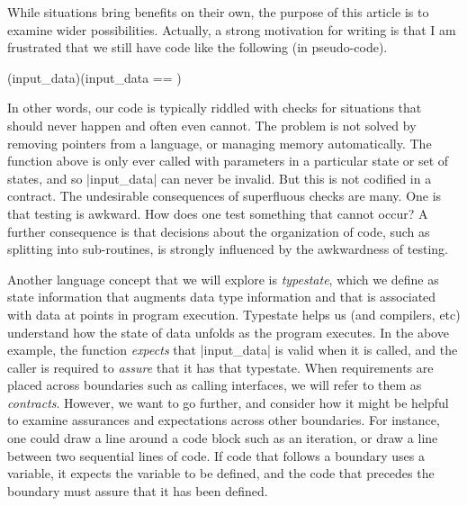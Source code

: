 \documentclass[10pt]{amsart}
\begin{document}
While situations bring benefits on their own, the purpose of this
article is to examine wider possibilities.  Actually, a strong
motivation for writing is that I am frustrated that we still have code
like the following (in pseudo-code).
\begin{offsideBlue}
\begin{PVerbatim}
  \ckw[function](\ctype[*inputStructure] input_data)\cop[:]
     \ckw[if] (input_data == \clab[null])\cop[:]
                
     \cend
  \cend
\end{PVerbatim}
\end{offsideBlue}
In other words, our code is typically riddled with checks for
situations that should never happen and often even cannot.  The
problem is not solved by removing pointers from a language, or
managing memory automatically.  The function above is only ever called
with parameters in a particular state or set of states, and so
|input_data| can never be invalid.  But this is not codified in a
contract.  The undesirable consequences of superfluous checks are
many.  One is that testing is awkward.  How does one test something
that cannot occur?  A further consequence is that decisions about the
organization of code, such as splitting into sub-routines, is strongly
influenced by the awkwardness of testing.

Another language concept that we will explore is \emph{typestate},
which we define as state information that augments data type
information and that is associated with data at points in program
execution.  Typestate helps us (and compilers, etc) understand how the
state of data unfolds as the program executes.  In the above example,
the function \emph{expects} that |input_data| is valid when it is
called, and the caller is required to \emph{assure} that it has that
typestate.  When requirements are placed across boundaries such as
calling interfaces, we will refer to them as \emph{contracts}.
However, we want to go further, and consider how it might be helpful
to examine assurances and expectations across other boundaries.  For
instance, one could draw a line around a code block such as an
iteration, or draw a line between two sequential lines of code.  If
code that follows a boundary uses a variable, it expects the variable
to be defined, and the code that precedes the boundary must assure
that it has been defined.
\end{document}
